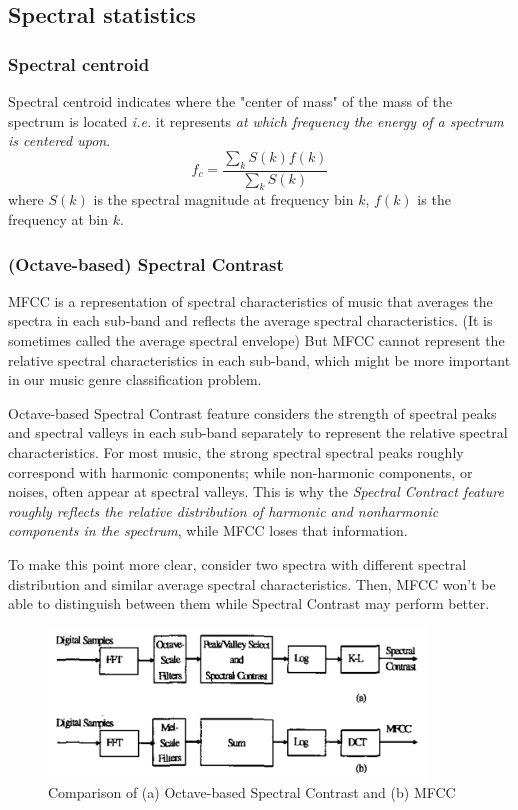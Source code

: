 \documentclass{article}
\theoremstyle{plain}
\theoremstyle{definition}
\theoremstyle{remark}
\begin{document}
\subsection{Spectral statistics}

\subsubsection{Spectral centroid}

Spectral centroid indicates where the "center of mass" of the mass of the spectrum is located {\it i.e.} it represents {\it at which frequency the energy of a spectrum is centered upon}.
$$f_c = \frac{\sum_k S(k) f(k)}{\sum_k S(k)}$$
where $S(k)$ is the spectral magnitude at frequency bin $k$, $f(k)$ is the frequency at bin $k$.

\subsubsection{(Octave-based) Spectral Contrast}

	MFCC is a representation of spectral characteristics of music that averages the spectra in each sub-band and reflects the average spectral characteristics. (It is sometimes called the average spectral envelope)
	But MFCC cannot represent the relative spectral characteristics in each sub-band, which might be more important in our music genre classification problem.

	Octave-based Spectral Contrast feature considers the strength of spectral peaks and spectral valleys in each sub-band separately to represent the relative spectral characteristics.
	For most music, the strong spectral spectral peaks roughly correspond with harmonic components; while non-harmonic components, or noises, often appear at spectral valleys.
	This is why the {\it Spectral Contract feature roughly reflects the relative distribution of harmonic and nonharmonic components in the spectrum}, while MFCC loses that information.

	To make this point more clear, consider two spectra with different spectral distribution and similar average spectral characteristics. Then, MFCC won't be able to distinguish between them while Spectral Contrast may perform better.

\begin{figure}[hbt!]
\includegraphics[height=4cm]{fig4.png}
    \centering
    \caption{Comparison of (a) Octave-based Spectral Contrast and (b) MFCC}
\end{figure}
\end{document}
